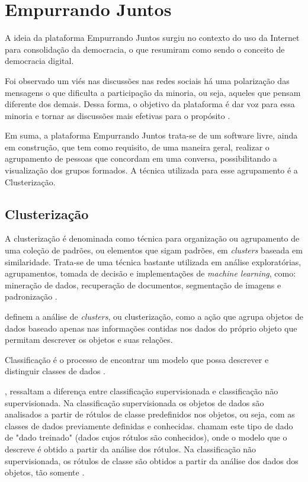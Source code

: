\chapter{Empurrando Juntos} \label{cap:clusterizacao}

A ideia da plataforma Empurrando Juntos surgiu no contexto do uso da Internet para
consolidação da democracia, o que  resumiram como sendo o conceito de democracia digital.

Foi observado um viés nas discussões nas redes sociais há uma polarização das mensagens o que dificulta
a participação da minoria, ou seja, aqueles que pensam diferente dos demais. Dessa forma,
o objetivo da plataforma é dar voz para essa minoria e tornar as discussões mais efetivas para o propósito \cite{empurrandojuntos}. 

Em suma, a plataforma Empurrando Juntos trata-se de um software livre, ainda em construção, que tem como 
requisito, de uma maneira geral, realizar o agrupamento de pessoas que concordam em uma conversa, possibilitando a visualização dos grupos formados. 
A técnica utilizada para esse agrupamento é a Clusterização.

\section{Clusterização}
A clusterização é denominada como técnica para organização ou agrupamento de uma coleção de padrões, ou elementos que sigam padrões, em \textit{clusters} baseada em similaridade.
Trata-se de uma técnica bastante utilizada em análise exploratórias, agrupamentos, tomada de decisão e implementações de \textit{machine learning}, como:
mineração de dados, recuperação de documentos, segmentação de imagens e padronização \cite{clustering_review}.

 definem a análise de \textit{clusters}, ou clusterização, como a ação que agrupa objetos de dados baseado apenas nas informações contidas
nos dados do próprio objeto que permitam descrever os objetos e suas relações. 

Classificação é o processo de encontrar um modelo que possa descrever e distinguir classes de dados \cite{han2011data}.

,  ressaltam a diferença entre classificação supervisionada e classificação não supervisionada.
Na classificação supervisionada os objetos de dados são analisados a partir de rótulos de classe predefinidos nos objetos, ou seja, 
com as classes de dados previamente definidas e conhecidas.  chamam este tipo de dado de "dado treinado"
(dados cujos rótulos são conhecidos), onde o modelo que o descreve é obtido a partir da análise dos rótulos.
Na classificação não supervisionada, os rótulos de classe são obtidos a partir da análise dos dados dos objetos, tão somente \cite{tan2013data}.

